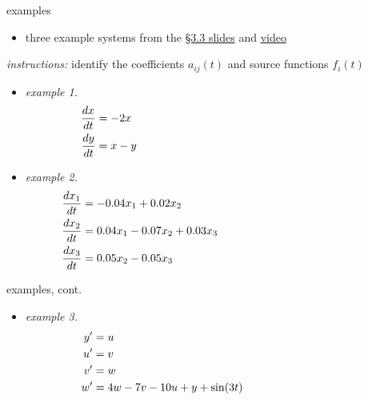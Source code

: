 \documentclass[urlcolor=blue,dvipsnames]{beamer}
\begin{document}
\begin{frame}{examples}

\small
\begin{itemize}
\item three example systems from the \href{https://bueler.github.io/math302/assets/slides/3-3.pdf}{\S3.3 slides} and \href{https://drive.explaineverything.com/thecode/XAAUNGS}{video}
\end{itemize}

\noindent \emph{instructions:} identify the coefficients $a_{ij}(t)$ and source functions $f_i(t)$

\begin{itemize}
\item \emph{example 1.}
\begin{align*}
\frac{dx}{dt} &= - 2 x \hspace{70mm} \\
\frac{dy}{dt} &= x - y
\end{align*}
\item \emph{example 2.}
\begin{align*}
\frac{dx_1}{dt} &= -0.04 x_1 + 0.02 x_2 \hspace{60mm} \\
\frac{dx_2}{dt} &= 0.04 x_1 - 0.07 x_2 + 0.03 x_3 \\
\frac{dx_3}{dt} &= 0.05 x_2 - 0.05 x_3
\end{align*}
\end{itemize}
\end{frame}


\begin{frame}{examples, cont.}

\small
\begin{itemize}
\item \emph{example 3.}
\begin{align*}
y' &= u \hspace{75mm} \\
u' &= v \\
v' &= w \\
w' &= 4w-7v-10u+y+\sin(3t)
\end{align*}
\end{itemize}

\vspace{40mm}
\end{frame}
\end{document}
